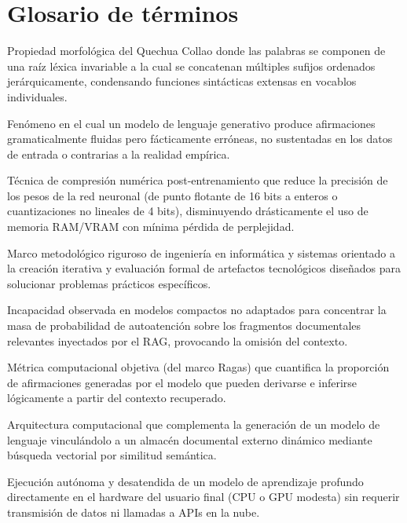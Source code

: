 \newpage
{}
{}
\section*{Glosario de términos}

\begin{description}[leftmargin=1.8em, itemsep=0.6em]
	\item[\textbf{Aglutinación:}] Propiedad morfológica del Quechua Collao donde las palabras se componen de una raíz léxica invariable a la cual se concatenan múltiples sufijos ordenados jerárquicamente, condensando funciones sintácticas extensas en vocablos individuales.
	\item[\textbf{Alucinación semántica:}] Fenómeno en el cual un modelo de lenguaje generativo produce afirmaciones gramaticalmente fluidas pero fácticamente erróneas, no sustentadas en los datos de entrada o contrarias a la realidad empírica.
	\item[\textbf{Cuantización (GGUF / NF4):}] Técnica de compresión numérica post-entrenamiento que reduce la precisión de los pesos de la red neuronal (de punto flotante de 16 bits a enteros o cuantizaciones no lineales de 4 bits), disminuyendo drásticamente el uso de memoria RAM/VRAM con mínima pérdida de perplejidad.
	\item[\textbf{Design Science Research (DSR):}] Marco metodológico riguroso de ingeniería en informática y sistemas orientado a la creación iterativa y evaluación formal de artefactos tecnológicos diseñados para solucionar problemas prácticos específicos.
	\item[\textbf{Dispersión atencional (\textit{Attention Dispersion}):}] Incapacidad observada en modelos compactos no adaptados para concentrar la masa de probabilidad de autoatención sobre los fragmentos documentales relevantes inyectados por el RAG, provocando la omisión del contexto.
	\item[\textbf{Fidelidad factual (\textit{Faithfulness}):}] Métrica computacional objetiva (del marco Ragas) que cuantifica la proporción de afirmaciones generadas por el modelo que pueden derivarse e inferirse lógicamente a partir del contexto recuperado.
	\item[\textbf{Generación Aumentada por Recuperación (RAG):}] Arquitectura computacional que complementa la generación de un modelo de lenguaje vinculándolo a un almacén documental externo dinámico mediante búsqueda vectorial por similitud semántica.
	\item[\textbf{Inferencia local \textit{on-device}:}] Ejecución autónoma y desatendida de un modelo de aprendizaje profundo directamente en el hardware del usuario final (CPU o GPU modesta) sin requerir transmisión de datos ni llamadas a APIs en la nube.

\end{description}
